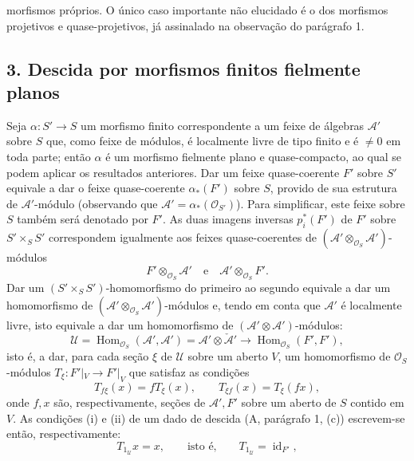 \documentclass[11pt,twoside,openany]{book}
\numberwithin{equation}{section}
\newcommand{\src}[1]{%
  \phantomsection\hypertarget{src:#1}{}%
  \marginpar{\raggedleft\footnotesize\sffamily #1}%
}
\theoremstyle{plain}
\theoremstyle{definition}
\theoremstyle{remark}
\newcommand{\FgaUnitKey}{frontmatter}
\renewcommand{\src}[1]{%
  \phantomsection\hypertarget{src:\FgaUnitKey:#1}{}%
  \marginpar{\raggedleft\footnotesize\sffamily #1}%
}
\begin{document}
\src{319}
morfismos próprios. O único caso importante não elucidado é o dos
morfismos projetivos e quase-projetivos, já assinalado na observação do
parágrafo 1.

\subsection*{3. Descida por morfismos finitos fielmente planos}

Seja $\alpha:S'\longrightarrow S$ um morfismo finito correspondente a um feixe de
álgebras $\mathcal A'$ sobre $S$ que, como feixe de módulos, é localmente livre
de tipo finito e é $\ne0$ em toda parte; então $\alpha$ é um morfismo
fielmente plano e quase-compacto, ao qual se podem aplicar os resultados
anteriores. Dar um feixe quase-coerente $F'$ sobre $S'$ equivale a dar o feixe
quase-coerente $\alpha_*(F')$ sobre $S$, provido de sua estrutura de
$\mathcal A'$-módulo (observando que
$\mathcal A'=\alpha_*(\mathcal O_{S'})$). Para simplificar, este feixe sobre $S$
também será denotado por $F'$. As duas imagens inversas $p_i^*(F')$ de $F'$
sobre $S'\times_SS'$ correspondem igualmente aos feixes quase-coerentes de
$(\mathcal A'\otimes_{\mathcal O_S}\mathcal A')$-módulos
\[
  F'\otimes_{\mathcal O_S}\mathcal A'
  \quad\text{e}\quad
  \mathcal A'\otimes_{\mathcal O_S}F'.
\]
Dar um $(S'\times_SS')$-homomorfismo do primeiro ao segundo equivale a dar um
homomorfismo de $(\mathcal A'\otimes_{\mathcal O_S}\mathcal A')$-módulos e,
tendo em conta que $\mathcal A'$ é localmente livre, isto equivale a dar
um homomorfismo de $(\mathcal A'\otimes\mathcal A')$-módulos:
\[
  \mathcal U=
  \operatorname{Hom}_{\mathcal O_S}(\mathcal A',\mathcal A')
  =\mathcal A'\otimes\check{\mathcal A}'
  \longrightarrow
  \operatorname{Hom}_{\mathcal O_S}(F',F'),
\]
isto é, a dar, para cada seção $\xi$ de $\mathcal U$ sobre um aberto $V$,
um homomorfismo de $\mathcal O_S$-módulos
$T_\xi:F'|_V\longrightarrow F'|_V$ que satisfaz as condições
\begin{equation}
  T_{f\xi}(x)=fT_\xi(x),
  \qquad T_{\xi f}(x)=T_\xi(fx),
  \tag{3.1}
\end{equation}
onde $f,x$ são, respectivamente, seções de $\mathcal A',F'$ sobre um
aberto de $S$ contido em $V$. As condições (i) e (ii) de um dado de
descida (A, parágrafo 1, (c)) escrevem-se então, respectivamente:
\begin{equation}
  T_{1_{\mathcal U}}x=x,
  \qquad\text{isto é,}\qquad
  T_{1_{\mathcal U}}=\operatorname{id}_{F'},
  \tag{3.2}
\end{equation}
\end{document}

